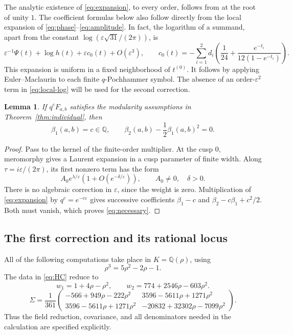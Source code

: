 \documentclass[11pt,reqno]{amsart}
\newcommand{\QQ}{\mathbb Q}
\newtheorem{lemma}[theorem]{Lemma}
\theoremstyle{remark}
\numberwithin{equation}{section}
\begin{document}
The analytic existence of \eqref{eq:expansion}, to every order, follows
from \cite[Theorem~2.1]{Mizuno} at the root of unity $1$.
The coefficient formulas below also follow directly from
the local expansion of \eqref{eq:phase}--\eqref{eq:amplitude}.
In fact, the logarithm of a summand, apart from the constant
$\log(\varepsilon\sqrt{31}/(2\pi))$, is
\begin{equation}\label{eq:local-log}
 \varepsilon^{-1}\Psi(t)+\log h(t)+\varepsilon c_0(t)
   +O(\varepsilon^3),\qquad
 c_0(t)=-\sum_{i=1}^2d_i
       \left(\frac1{24}+\frac{e^{-t_i}}{12(1-e^{-t_i})}\right).
\end{equation}
This expansion is uniform in a fixed neighborhood of $t^{(0)}$.
It follows by applying Euler--Maclaurin to each finite
$q$-Pochhammer symbol. The absence of an order-$\varepsilon^2$ term
in \eqref{eq:local-log} will be used for the second correction.

\begin{lemma}\label{lem:cusp}
If $q^cF_{a,b}$ satisfies the modularity assumptions in
Theorem~\ref{thm:individual}, then
\begin{equation}\label{eq:necessary}
 \beta_1(a,b)=c\in\QQ,\qquad
 \beta_2(a,b)-\frac12\beta_1(a,b)^2=0.
\end{equation}
\end{lemma}
\begin{proof}
Pass to the kernel of the finite-order multiplier. At the cusp $0$,
meromorphy gives a Laurent expansion in a cusp parameter of finite
width. Along $\tau=i\varepsilon/(2\pi)$, its first nonzero term has
the form
\[
 A_0e^{\lambda/\varepsilon}
 \left(1+O(e^{-\delta/\varepsilon})\right),\qquad
 A_0\ne0,\quad \delta>0.
\]
There is no algebraic correction in $\varepsilon$, since the weight
is zero. Multiplication of \eqref{eq:expansion} by
$q^c=e^{-c\varepsilon}$ gives successive coefficients
$\beta_1-c$ and $\beta_2-c\beta_1+c^2/2$.
Both must vanish, which proves \eqref{eq:necessary}.
\end{proof}

\subsection{The first correction and its rational locus}
All of the following computations take place in $K=\QQ(\rho)$, using
\begin{equation}\label{eq:reduction}
 \rho^3=5\rho^2-2\rho-1.
\end{equation}
The data in \eqref{eq:HC} reduce to
\begin{equation}\label{eq:wexplicit}
 w_1=1+4\rho-\rho^2,\qquad
 w_2=774+2546\rho-603\rho^2.
\end{equation}
\begin{equation}\label{eq:Cexplicit}
 \Sigma=\frac1{361}
 \begin{pmatrix}
 -566+949\rho-222\rho^2&3596-5611\rho+1271\rho^2\\
 3596-5611\rho+1271\rho^2&-20832+32302\rho-7099\rho^2
 \end{pmatrix}.
\end{equation}
Thus the field reduction, covariance, and all denominators needed
in the calculation are specified explicitly.
\end{document}
